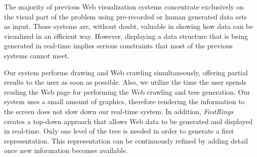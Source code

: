 \documentclass[10pt,psfig]{article}
\begin{document}
{%

The majority of previous Web visualization systems concentrate exclusively on the visual part of the problem using pre-recorded or human generated data sets as input.
Those systems are, without doubt, valuable in showing how data can be visualized in an efficient way.
However, displaying a data structure that is being generated in real-time implies serious constraints that most of the previous systems cannot meet.


Our system performs drawing and Web crawling simultaneously, offering partial results to the user as soon as possible.
Also, we utilize the time the user spends reading the Web page for performing the Web crawling and tree generation.
Our system uses a small amount of graphics, therefore rendering the information to the screen does not slow down our real-time system.
In addition, {\em FastRings} creates a top-down approach that allows Web data to be generated and displayed in real-time.
Only one level of the tree is needed in order to generate a first representation.
This representation can be continuously refined by adding detail once new information becomes available.

}
\end{document}
